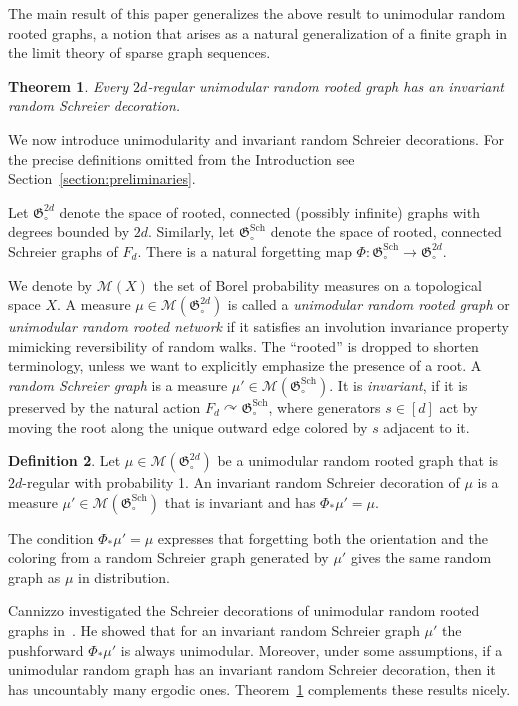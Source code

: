 \documentclass[11pt]{article}
\newtheorem{theo}{Theorem}[section]
\theoremstyle{definition}
\newtheorem{defi}[theo]{Definition}
\numberwithin{equation}{section}
\numberwithin{figure}{section}
\numberwithin{table}{section}
\newcommand{\clM}{\mathcal{M}}
\newcommand{\GoG}{\mathfrak{G}}
\DeclareMathOperator{\Sch}{Sch}
\newcommand{\acts}{\curvearrowright}
\begin{document}
The main result of this paper generalizes the above result to unimodular random rooted graphs, a notion that arises as a natural generalization of a finite graph in the limit theory of sparse graph sequences.

\begin{theo}\label{theorem:main}
Every $2d$-regular unimodular random rooted graph has an invariant random Schreier decoration.
\end{theo}
We now introduce unimodularity and invariant random Schreier decorations. For the precise definitions omitted from the Introduction see Section~\ref{section:preliminaries}.

Let $\GoG_{\circ}^{2d}$ denote the space of rooted, connected (possibly infinite) graphs with degrees bounded by $2d$. Similarly, let $\GoG_{\circ}^{\Sch}$ denote the space of rooted, connected Schreier graphs of $F_d$. There is a natural forgetting map $\Phi: \GoG_{\circ}^{\Sch} \to \GoG_{\circ}^{2d}$.

We denote by $\clM(X)$ the set of Borel probability measures on a topological space $X$. A measure $\mu \in \clM(\GoG_{\circ}^{2d})$ is called a \emph{unimodular random rooted graph} or \emph{unimodular random rooted network} if it satisfies an involution invariance property mimicking reversibility of random walks. The ``rooted'' is dropped to shorten terminology, unless we want to explicitly emphasize the presence of a root. A \emph{random Schreier graph} is a measure $\mu' \in \clM(\GoG_{\circ}^{\Sch})$. It is \emph{invariant}, if it is preserved by the natural action $F_d \acts \GoG_{\circ}^{\Sch}$, where generators $s \in [d]$ act by moving the root along the unique outward edge colored by $s$ adjacent to it.

\begin{defi}\label{definition:invariant_schreierization}
Let $\mu \in \clM(\GoG_{\circ}^{2d})$ be a unimodular random rooted graph that is $2d$-regular with probability 1. An invariant random Schreier decoration of $\mu$ is a measure $\mu' \in \clM(\GoG_{\circ}^{\Sch})$ that is invariant and has $\Phi_{*} \mu' = \mu$.
\end{defi}
\noindent The condition $\Phi_{*} \mu' = \mu$ expresses that forgetting both the orientation and the coloring from a random Schreier graph generated by $\mu'$ gives the same random graph as $\mu$ in distribution.



Cannizzo investigated the Schreier decorations of unimodular random rooted graphs in~\cite{cannizzo2013invariant}. He showed that for an invariant random Schreier graph $\mu'$ the pushforward $\Phi_{*} \mu'$ is always unimodular. Moreover, under some assumptions, if a unimodular random graph has an invariant random Schreier decoration, then it has uncountably many ergodic ones. Theorem~\ref{theorem:main} complements these results nicely.
\end{document}
